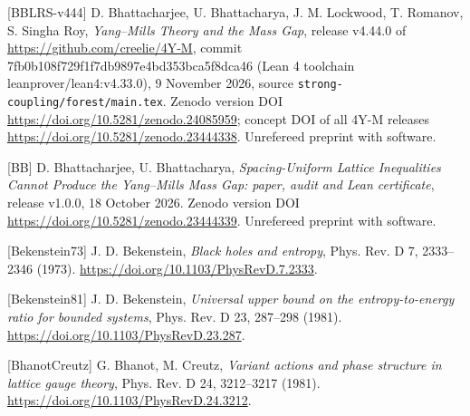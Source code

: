 \documentclass[10pt,letterpaper,twocolumn]{article}
\begin{document}
{[}BBLRS-v444{]} D. Bhattacharjee, U. Bhattacharya, J. M. Lockwood, T. Romanov, S. Singha Roy, \emph{Yang--Mills Theory and the Mass Gap}, release v4.44.0 of \href{https://github.com/creelie/4Y-M}{https:\allowbreak{}/\allowbreak{}/\allowbreak{}github.\allowbreak{}com/\allowbreak{}creelie/\allowbreak{}4Y-\allowbreak{}M}, commit 7fb0b108\allowbreak{}f729f1f7\allowbreak{}db9897e4\allowbreak{}bd353bca\allowbreak{}5f8dca46 (Lean 4 toolchain leanprov\allowbreak{}er/\allowbreak{}lean4:\allowbreak{}v4.\allowbreak{}33.\allowbreak{}0)\allowbreak{}, 9 November 2026, source \texttt{strong-{}\allowbreak{}coupling/\allowbreak{}forest/\allowbreak{}main.\allowbreak{}tex}. Zenodo version DOI \href{https://doi.org/10.5281/zenodo.24085959}{https:\allowbreak{}/\allowbreak{}/\allowbreak{}doi.\allowbreak{}org/\allowbreak{}10.\allowbreak{}5281/\allowbreak{}zenodo.\allowbreak{}24085959}; concept DOI of all 4Y-M releases \href{https://doi.org/10.5281/zenodo.23444338}{https:\allowbreak{}/\allowbreak{}/\allowbreak{}doi.\allowbreak{}org/\allowbreak{}10.\allowbreak{}5281/\allowbreak{}zenodo.\allowbreak{}23444338}. Unrefereed preprint with software.

{[}BB{]} D. Bhattacharjee, U. Bhattacharya, \emph{Spacing-Uniform Lattice Inequalities Cannot Produce the Yang--Mills Mass Gap: paper, audit and Lean certificate}, release v1.0.0, 18 October 2026. Zenodo version DOI \href{https://doi.org/10.5281/zenodo.23444339}{https:\allowbreak{}/\allowbreak{}/\allowbreak{}doi.\allowbreak{}org/\allowbreak{}10.\allowbreak{}5281/\allowbreak{}zenodo.\allowbreak{}23444339}. Unrefereed preprint with software.

{[}Bekenstein73{]} J. D. Bekenstein, \emph{Black holes and entropy}, Phys. Rev. D 7, 2333--2346 (1973). \href{https://doi.org/10.1103/PhysRevD.7.2333}{https:\allowbreak{}/\allowbreak{}/\allowbreak{}doi.\allowbreak{}org/\allowbreak{}10.\allowbreak{}1103/\allowbreak{}PhysRevD\allowbreak{}.\allowbreak{}7.\allowbreak{}2333}.

{[}Bekenstein81{]} J. D. Bekenstein, \emph{Universal upper bound on the entropy-to-energy ratio for bounded systems}, Phys. Rev. D 23, 287--298 (1981). \href{https://doi.org/10.1103/PhysRevD.23.287}{https:\allowbreak{}/\allowbreak{}/\allowbreak{}doi.\allowbreak{}org/\allowbreak{}10.\allowbreak{}1103/\allowbreak{}PhysRevD\allowbreak{}.\allowbreak{}23.\allowbreak{}287}.

{[}BhanotCreutz{]} G. Bhanot, M. Creutz, \emph{Variant actions and phase structure in lattice gauge theory}, Phys. Rev. D 24, 3212--3217 (1981). \href{https://doi.org/10.1103/PhysRevD.24.3212}{https:\allowbreak{}/\allowbreak{}/\allowbreak{}doi.\allowbreak{}org/\allowbreak{}10.\allowbreak{}1103/\allowbreak{}PhysRevD\allowbreak{}.\allowbreak{}24.\allowbreak{}3212}.
\end{document}
